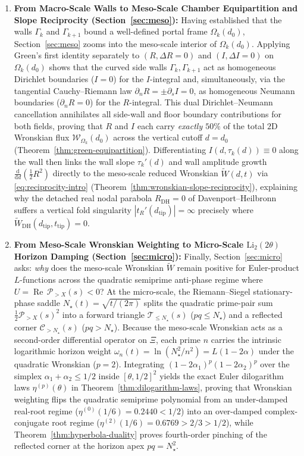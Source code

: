 \documentclass[11pt,reqno]{amsart}
\theoremstyle{definition}
\theoremstyle{remark}
\numberwithin{equation}{section}
\newcommand{\dd}{\mathrm{d}}
\newcommand{\RePt}{\operatorname{Re}}
\newcommand{\Li}{\mathrm{Li}}
\newcommand{\DHf}{\mathrm{DH}}
\begin{document}
\begin{enumerate}[label=\textbf{Step \arabic*.},leftmargin=4.2em]
\item \textbf{From Macro-Scale Walls to Meso-Scale Chamber Equipartition and Slope Reciprocity (Section~\ref{sec:meso}):} Having established that the walls $\Gamma_k$ and $\Gamma_{k+1}$ bound a well-defined portal frame $\Omega_k(d_0)$, Section~\ref{sec:meso} zooms into the meso-scale interior of $\Omega_k(d_0)$. Applying Green's first identity separately to $(R,\Delta R=0)$ and $(I,\Delta I=0)$ on $\Omega_k(d_0)$ shows that the curved side walls $\Gamma_k,\Gamma_{k+1}$ act as homogeneous Dirichlet boundaries ($I=0$) for the $I$-integral and, simultaneously, via the tangential Cauchy--Riemann law $\partial_n R = \pm \partial_s I = 0$, as homogeneous Neumann boundaries ($\partial_n R = 0$) for the $R$-integral. This dual Dirichlet--Neumann cancellation annihilates all side-wall and floor boundary contributions for both fields, proving that $R$ and $I$ each carry \emph{exactly $50\%$} of the total $2$D Wronskian flux $\mathcal{W}_{\Omega_k}(d_0)$ across the vertical cutoff $d=d_0$ (Theorem~\ref{thm:green-equipartition}). Differentiating $I(d,\tau_k(d))\equiv 0$ along the wall then links the wall slope $\tau_k'(d)$ and wall amplitude growth $\frac{\dd}{\dd d}(\frac{1}{2}R^2)$ directly to the meso-scale reduced Wronskian $\widetilde{W}(d,t)$ via \eqref{eq:reciprocity-intro} (Theorem~\ref{thm:wronskian-slope-reciprocity}), explaining why the detached real nodal parabola $R_{\DHf}=0$ of Davenport--Heilbronn suffers a vertical fold singularity $|t_R'(d_{\mathrm{tip}})|=\infty$ precisely where $\widetilde{W}_{\DHf}(d_{\mathrm{tip}},t_{\mathrm{tip}})=0$.
\item \textbf{From Meso-Scale Wronskian Weighting to Micro-Scale $\Li_2(2\theta)$ Horizon Damping (Section~\ref{sec:micro}):} Finally, Section~\ref{sec:micro} asks: \emph{why} does the meso-scale Wronskian $\widetilde{W}$ remain positive for Euler-product $L$-functions across the quadratic semiprime anti-phase regime where $U = \RePt\,\mathcal{P}_{>X}(s) < 0$? At the micro-scale, the Riemann--Siegel stationary-phase saddle $N_\star(t)=\sqrt{t/(2\pi)}$ splits the quadratic prime-pair sum $\frac{1}{2}\mathcal{P}_{>X}(s)^2$ into a forward triangle $\mathcal{T}_{\le N_\star}(s)$ ($pq \le N_\star$) and a reflected corner $\mathcal{C}_{>N_\star}(s)$ ($pq > N_\star$). Because the meso-scale Wronskian acts as a second-order differential operator on $\Xi$, each prime $n$ carries the intrinsic logarithmic horizon weight $\omega_n(t) = \ln(N_\star^2/n^2) = L(1-2\alpha)$ under the quadratic Wronskian ($p=2$). Integrating $(1-2\alpha_1)^p(1-2\alpha_2)^p$ over the simplex $\alpha_1+\alpha_2 \le 1/2$ inside $[\theta,1/2]^2$ yields the exact Euler dilogarithm laws $\eta^{(p)}(\theta)$ in Theorem~\ref{thm:dilogarithm-laws}, proving that Wronskian weighting flips the quadratic semiprime polynomial from an under-damped real-root regime ($\eta^{(0)}(1/6)=0.2440 < 1/2$) into an over-damped complex-conjugate root regime ($\eta^{(2)}(1/6)=0.6769 > 2/3 > 1/2$), while Theorem~\ref{thm:hyperbola-duality} proves fourth-order pinching of the reflected corner at the horizon apex $pq=N_\star^2$.
\end{enumerate}
\end{document}

